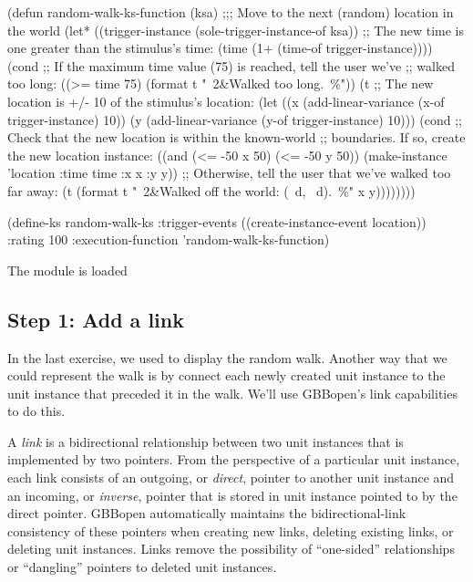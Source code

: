 \documentclass[10pt,twoside,english,pdftex]{article}
\begin{document}
\begin{example}
  (defun random-walk-ks-function (ksa)
    ;;; Move to the next (random) location in the world
    (let* ((trigger-instance (sole-trigger-instance-of ksa))
           ;; The new time is one greater than the stimulus's time:
           (time (1+ (time-of trigger-instance))))
      (cond
       ;; If the maximum time value (75) is reached, tell the user we've
       ;; walked too long:
       ((>= time 75) (format t "~2&Walked too long.~\%"))
       (t ;; The new location is +/- 10 of the stimulus's location:
        (let ((x (add-linear-variance (x-of trigger-instance) 10))
              (y (add-linear-variance (y-of trigger-instance) 10)))
          (cond
           ;; Check that the new location is within the known-world
           ;; boundaries.  If so, create the new location instance:
           ((and (<= -50 x 50) (<= -50 y 50))
            (make-instance 'location 
              :time time 
              :x x 
              :y y))
           ;; Otherwise, tell the user that we've walked too far away:
           (t (format t "~2&Walked off the world: (~d, ~d).~\%" x y))))))))

  (define-ks random-walk-ks
      :trigger-events ((create-instance-event location))
      :rating 100
      :execution-function 'random-walk-ks-function)
\end{example}

\begin{tightitemize}
\item The  module is loaded
\end{tightitemize}

\subsection*{Step 1: Add  a link}

In the last exercise, we used  to
display the random walk.  Another way that we could represent the walk is by
connect each newly created  unit instance to the
 unit instance that preceded it in the walk.  We'll use
GBBopen's link capabilities to do this.

A \textit{link} is a bidirectional relationship between two unit instances
that is implemented by two pointers. From the perspective of a particular unit
instance, each link consists of an outgoing, or \textit{direct}, pointer to
another unit instance and an incoming, or \textit{inverse}, pointer that is
stored in unit instance pointed to by the direct pointer.  GBBopen
automatically maintains the bidirectional-link consistency of these pointers
when creating new links, deleting existing links, or deleting unit instances.
Links remove the possibility of ``one-sided'' relationships or ``dangling''
pointers to deleted unit instances.
\end{document}
